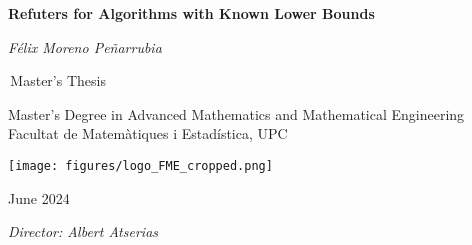 \begin{titlepage}
    \begin{center}
        \vspace*{1cm}
            
        \Huge
        \textbf{Refuters for Algorithms with Known Lower Bounds}
            
        \vspace{0.5cm}
        \Large
        \textit{Félix Moreno Peñarrubia}
            
        
            
        \,Master's Thesis
            
        \vspace{0.8cm}
            
       
            
        \Large
        Master's Degree in Advanced Mathematics and Mathematical Engineering \\
        Facultat de Matemàtiques i Estadística, UPC 
        \vspace{1.2cm}
        

          
        \texttt{[image: figures/logo\_FME\_cropped.png]}
 
        \vfill
        
      
        June 2024
        
		\vspace{2cm}
		\large        
        \textit{Director: Albert Atserias}
        
        
            
    \end{center}
\end{titlepage}